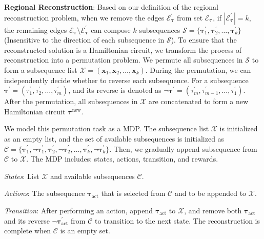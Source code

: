 \textbf{Regional Reconstruction}: 
Based on our definition of the regional reconstruction problem, when we remove the edges $\mathcal{E}_{\boldsymbol{\tau}}^{\prime}$ from set $\mathcal{E}_{\boldsymbol{\tau}}$, if $|\mathcal{E}_{\boldsymbol{\tau}}^{\prime}|=k$, the remaining edges $\mathcal{E}_{\boldsymbol{\tau}} \setminus \mathcal{E}_{\boldsymbol{\tau}}^{\prime}$ can compose $k$ subsequences 
$\mathcal{S}=\{ \boldsymbol{\tau}_{1}^{\prime}, \boldsymbol{\tau}_{2}^{\prime}, \dots, \boldsymbol{\tau}_{k}^{\prime} \}$ (Insensitive to the direction of each subsequence in $\mathcal{S}$).  To ensure that the reconstructed solution is a Hamiltonian circuit, we transform the process of 
reconstruction 
into a permutation problem. We permute all subsequences in 
$\mathcal{S}$
to form a subsequence list $\mathcal{X}=(\boldsymbol{x}_{1}, \boldsymbol{x}_{2}, \dots, \boldsymbol{x}_{k})$. During the permutation, we can independently decide whether to reverse each subsequence. 
For a subsequence $\boldsymbol{\tau}^{\prime} = (\tau_1^{\prime}, \tau_2^{\prime}, \dots, \tau_{m}^{\prime})$, and its reverse is denoted as $\neg \boldsymbol{\tau}^{\prime} = (\tau_{m}^{\prime}, \tau_{m-1}^{\prime}, \dots, \tau_{1}^{\prime})$. 
After the permutation, all subsequences in $\mathcal{X}$ are concatenated to form a new Hamiltonian circuit $\boldsymbol{\tau}^{\text{new}}$.

We model this permutation task as a MDP. 
The subsequence list $\mathcal{X}$ is initialized as an empty list, and the set of available subsequences is initialized as $\mathcal{C}=\{\boldsymbol{\tau}_{1}^{\prime}, \neg\boldsymbol{\tau}_{1}^{\prime}, \boldsymbol{\tau}_{2}^{\prime}, \neg\boldsymbol{\tau}_{2}^{\prime},\dots,\boldsymbol{\tau}_{k}^{\prime}, \neg\boldsymbol{\tau}_{k}^{\prime}\}$. Then, we gradually append subsequence from $\mathcal{C}$ to $\mathcal{X}$.
The MDP includes: states, actions, transition, and rewards. 

\textit{States}: List $\mathcal{X}$ and available subsequences $\mathcal{C}$.

\textit{Actions}: The subsequence $\boldsymbol{\tau}_{\text{act}}$ that is selected from $\mathcal{C}$ and to be appended to $\mathcal{X}$.

\textit{Transition}: After performing an action, append $\boldsymbol{\tau}_{\text{act}}$ to $\mathcal{X}$, and remove both $\boldsymbol{\tau}_{\text{act}}$ and its reverse $\neg\boldsymbol{\tau}_{\text{act}}^{\prime}$ from $\mathcal{C}$ to transition to the next state. The reconstruction is complete when $\mathcal{C}$ is an empty set.

